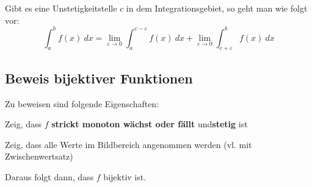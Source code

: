 Gibt es eine Unstetigkeitstelle $c$ in dem Integrationsgebiet, so geht man wie folgt vor:
\begin{equation*}
\int_a^b f(x)\ dx = \lim_{\varepsilon \to 0} \int_a^{c-\varepsilon} f(x)\ dx + \lim_{\varepsilon \to 0} \int_{c+\varepsilon}^b f(x)\ dx
\end{equation*}

\subsection{Beweis bijektiver Funktionen}

Zu beweisen sind folgende Eigenschaften:
\begin{description}[labelindent=16pt,style=multiline,leftmargin=3cm, noitemsep]
	\item[injektiv:] Zeig, dass $f$ \textbf{strickt monoton w{\"a}chst oder f{\"a}llt} und\textbf{stetig} ist
	\item[surjektiv:] Zeig, dass alle Werte im Bildbereich angenommen werden (vl. mit Zwischenwertsatz)
\end{description}
Daraus folgt dann, dass $f$ bijektiv ist.
